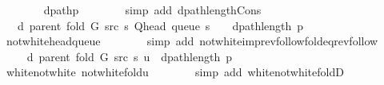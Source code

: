 \begin{isabellebody}
\ \ \ \ \ \ \isamarkupfalse%
\ dpath{\isacharunderscore}{\kern0pt}p\isanewline
\ \ \ \ \ \ \isamarkupfalse%
\ {\isacharparenleft}{\kern0pt}simp\ add{\isacharcolon}{\kern0pt}\ dpath{\isacharunderscore}{\kern0pt}length{\isacharunderscore}{\kern0pt}Cons{\isacharparenright}{\kern0pt}\isanewline
\ \ \ \ \isamarkupfalse%
\ \isamarkupfalse%
\ {\isachardoublequoteopen}{\isachardot}{\kern0pt}{\isachardot}{\kern0pt}{\isachardot}{\kern0pt}\ {\isacharequal}{\kern0pt}\ d\ {\isacharparenleft}{\kern0pt}parent\ {\isacharparenleft}{\kern0pt}fold\ G\ src\ s{\isacharparenright}{\kern0pt}{\isacharparenright}{\kern0pt}\ {\isacharparenleft}{\kern0pt}Q{\isacharunderscore}{\kern0pt}head\ {\isacharparenleft}{\kern0pt}queue\ s{\isacharparenright}{\kern0pt}{\isacharparenright}{\kern0pt}\ {\isacharplus}{\kern0pt}\ {}\ {\isacharplus}{\kern0pt}\ dpath{\isacharunderscore}{\kern0pt}length\ p{\isachardoublequoteclose}\isanewline
\ \ \ \ \ \ \isamarkupfalse%
\ not{\isacharunderscore}{\kern0pt}white{\isacharunderscore}{\kern0pt}head{\isacharunderscore}{\kern0pt}queue\isanewline
\ \ \ \ \ \ \isamarkupfalse%
\ {\isacharparenleft}{\kern0pt}simp\ add{\isacharcolon}{\kern0pt}\ not{\isacharunderscore}{\kern0pt}white{\isacharunderscore}{\kern0pt}imp{\isacharunderscore}{\kern0pt}rev{\isacharunderscore}{\kern0pt}follow{\isacharunderscore}{\kern0pt}fold{\isacharunderscore}{\kern0pt}eq{\isacharunderscore}{\kern0pt}rev{\isacharunderscore}{\kern0pt}follow{\isacharparenright}{\kern0pt}\isanewline
\ \ \ \ \isamarkupfalse%
\ \isamarkupfalse%
\ {\isachardoublequoteopen}{\isachardot}{\kern0pt}{\isachardot}{\kern0pt}{\isachardot}{\kern0pt}\ {\isacharequal}{\kern0pt}\ d\ {\isacharparenleft}{\kern0pt}parent\ {\isacharparenleft}{\kern0pt}fold\ G\ src\ s{\isacharparenright}{\kern0pt}{\isacharparenright}{\kern0pt}\ u\ {\isacharplus}{\kern0pt}\ dpath{\isacharunderscore}{\kern0pt}length\ p{\isachardoublequoteclose}\isanewline
\ \ \ \ \ \ \isamarkupfalse%
\ white{\isacharunderscore}{\kern0pt}not{\isacharunderscore}{\kern0pt}white\ not{\isacharunderscore}{\kern0pt}white{\isacharunderscore}{\kern0pt}fold{\isacharunderscore}{\kern0pt}u\isanewline
\ \ \ \ \ \ \isamarkupfalse%
\ {\isacharparenleft}{\kern0pt}simp\ add{\isacharcolon}{\kern0pt}\ white{\isacharunderscore}{\kern0pt}not{\isacharunderscore}{\kern0pt}white{\isacharunderscore}{\kern0pt}foldD{\isacharparenleft}{\kern0pt}{}{\isacharparenright}{\kern0pt}{\isacharparenright}{\kern0pt}\isanewline

\end{isabellebody}
